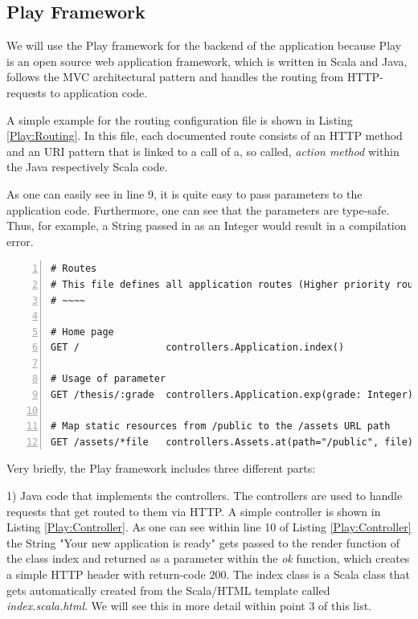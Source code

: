 \subsection{Play Framework}	
\label{Play2}
We will use the Play framework for the backend of the application because Play is an open source web application framework, which is written in Scala and Java, follows the \ac{MVC} architectural pattern and handles the routing from \ac{HTTP}-requests to application code. 

A simple example for the routing configuration file is shown in Listing \ref{Play:Routing}. In this file, each documented route consists of an \ac{HTTP} method and an \ac{URI} pattern that is linked to a call of a, so called, \textit{action method} within the Java respectively Scala code. 

As one can easily see in line 9, it is quite easy to pass parameters to the application code. Furthermore, one can see that the parameters are type-safe. Thus, for example, a String passed in as an Integer would result in a compilation error. 

\begin{lstlisting}[numbers=left,caption={Simple routing configuration file within the Play Framework},label=Play:Routing,frame=tlbr,breaklines]
# Routes
# This file defines all application routes (Higher priority routes first)
# ~~~~

# Home page
GET /               controllers.Application.index()

# Usage of parameter
GET /thesis/:grade  controllers.Application.exp(grade: Integer)

# Map static resources from /public to the /assets URL path
GET /assets/*file   controllers.Assets.at(path="/public", file)
\end{lstlisting}

Very briefly, the Play framework includes three different parts: 

1) Java code that implements the controllers. The controllers are used to handle requests that get routed to them via \ac{HTTP}. A simple controller is shown in Listing \ref{Play:Controller}. As one can see within line 10 of Listing \ref{Play:Controller} the String "Your new application is ready" gets passed to the render function of the class index and returned as a parameter within the \textit{ok} function, which creates a simple \ac{HTTP} header with return-code $200$. The index class is a Scala class that gets automatically created from the Scala/\acs{HTML} template called \textit{index.scala.html}. We will see this in more detail within point 3 of this list.

